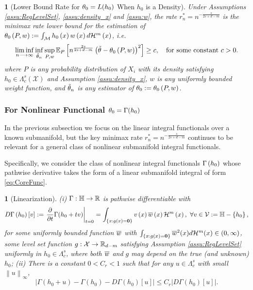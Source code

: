 \documentclass[12pt,american]{article}
\theoremstyle{definition}
\theoremstyle{plain}
\newtheorem{assumption}{\protect\assumptionname}
\theoremstyle{definition}
\theoremstyle{plain}
\theoremstyle{plain}
\theoremstyle{plain}
\newtheorem{cor}{\protect\corollaryname}
\theoremstyle{plain}
\theoremstyle{plain}
\newcommand{\R}{\mathbb{R}}
\newcommand{\E}{\mathbb{E}}
\newcommand{\norm}[1]{\left\| #1 \right\|}
\newcommand{\abs}[1]{\left| #1 \right|}
\providecommand{\assumptionname}{Assumption}
\providecommand{\assumptionname}{Assumption}
\providecommand{\corollaryname}{Corollary}
\begin{document}
\begin{cor}[Lower Bound Rate for $\theta_0=L(h_0)$ When $h_0$ is a Density]\label{cor:density} Under Assumptions   \ref{assu:RegLevelSet}, \ref{assu:density_x} and \ref{assu:w}, the rate
  $r^*_{n}=n^{-\frac{s}{2s+d-m}}$ is the minimax rate lower bound for the estimation of  $\theta_{0}\left(P,w\right):=\int_{{\cal M}}h_{0}\left(x\right)w\left(x\right)d{\cal H}^{m}\left(x\right)$, i.e.
  \[
    \liminf_{n\longrightarrow\infty}\inf_{\tilde{\t}_n}\sup_{P,w}\E_{P}\left[n^{\frac{2s}{2s+d-m}}\left(\tilde{\t}-\t_{0}\left(P,w\right)\right)^{2}\right]\geq c,\quad\text{for some constant }c>0.
  \]
  where $P$ is any probability distribution of $X_i$ with its density satisfying
  $h_0\in\Lambda_{c}^{s}\left(\mathcal{X}\right)$ and Assumption \ref{assu:density_x},
  $w$ is any uniformly bounded weight function,
  and $\tilde{\theta}_n$ is any estimator of $\theta_{0}:=\theta_{0}\left(P,w\right)$.
\end{cor}

\subsubsection{For Nonlinear Functional $\theta_0=\Gamma(h_0)$} \label{subsubsec:Minimax_NonLin-LB}

In the previous subsection we focus on the linear integral functionals over a known submanifold, but the key minimax rate $r^*_n = n^{-\frac{s}{2s+d-m}}$ continues to be relevant for a general class of nonlinear submanifold integral functionals.

Specifically, we consider the class of nonlinear integral functionals $\Gamma\left(h_{0}\right)$ whose pathwise derivative takes the form of a linear submanifold integral of form \eqref{eq:CoreFunc}.
\begin{assumption}[Linearization]
  \label{assu:DGamma_linear} (i) $\G:\H\to\R$ is pathwise differentiable with
  \begin{equation}
    D\Gamma\left(h_{0}\right)\left[v\right] :=\left.\frac{\partial}{\partial t} \Gamma(h_0+tv)\right|_{t=0} =\int_{\left\{ x:g\left(x\right)={\bf 0}\right\} }v\left(x\right)\overline{w}\left(x\right){\cal H}^{m}\left(x\right),\ \forall v\in{\cal V}:=\mathbb{H}-\left\{ h_{0}\right\} ,\label{eq:PathD}
  \end{equation}
  for some uniformly bounded function $\overline{w}$ with $\int_{\{x:g(x)={\bf 0}\}}\overline{w}^2(x)d\mathcal{H}^m(x)\in(0,\infty)$,  some level set function $g:{\cal X}\to\R_{d-m}$ satisfying Assumption \ref{assu:RegLevelSet} uniformly in $h_0\in\Lambda^s_c$, where both $\overline{w}$ and $g$ may depend on the true (and unknown) $h_{0}$;
  \newline
  (ii) There is a constant $0<C_r<1$ such that for any $u\in\Lambda^s_c$ with small $\norm{u}_{\infty}$,
  \[
    \abs{\Gamma(h_0+u)-\Gamma(h_0)-D\Gamma(h_0)[u]}\le C_r\abs{D\Gamma(h_0)[u]}.
  \]
\end{assumption}
\end{document}
